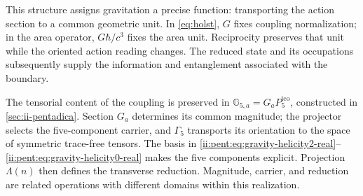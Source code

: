 This structure assigns gravitation a precise function:
transporting the action section to a common geometric unit.
In \eqref{eq:holst}, \(G\) fixes coupling normalization;
in the area operator, \(G\hbar/c^3\) fixes the area unit.
Reciprocity preserves that unit while the oriented action
reading changes. The reduced state and its occupations subsequently supply
the information and entanglement associated with the boundary.

The tensorial content of the coupling is preserved in
\(\mathbb G_{5,a}=G_aP^{\mathrm{ico}}_5\), constructed in
\ref{sec:ii-pentadica}. Section \(G_a\) determines its common magnitude;
the projector selects the five-component carrier, and \(\Gamma_5\)
transports its orientation to the space of symmetric trace-free tensors.
The basis in \eqref{ii:pent:eq:gravity-helicity2-real}--\eqref{ii:pent:eq:gravity-helicity0-real}
makes the five components explicit. Projection \(\Lambda(n)\) then defines
the transverse reduction. Magnitude, carrier, and reduction are
related operations with different domains within this realization.
